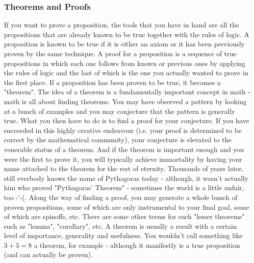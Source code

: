 \subsubsection{Theorems and Proofs}
If you want to prove a proposition, the tools that you have in hand are all the propositions that are already known to be true together with the rules of logic. A proposition is known to be true if it is either an axiom or it has been previously proven by the same technique. A proof for a proposition is a sequence of true propositions in which each one follows from known or previous ones by applying the rules of logic and the last of which is the one you actually wanted to prove in the first place. If a proposition has been proven to be true, it becomes a "theorem". The idea of a theorem is a fundamentally important concept in math - math is all about finding theorems. You may have observed a pattern by looking at a bunch of examples and you may conjecture that the pattern is generally true. What you then have to do is to find a proof for your conjecture. If you have succeeded in this highly creative endeavour (i.e. your proof is determined to be correct by the mathematical community), your conjecture is elevated to the venerable status of a theorem. And if the theorem is important enough and you were the first to prove it, you will typically achieve immortality by having your name attached to the theorem for the rest of eternity. Thousands of years later, still everbody knows the name of Pythagoras today - although, it wasn't actually him who proved "Pythagoras' Theorem" - sometimes the world is a little unfair, too :'-(. Along the way of finding a proof, you may generate a whole bunch of proven propositions, some of which are only instrumental to your final goal, some of which are spinoffs, etc. There are some other terms for such "lesser theorems" such as "lemma", "corollary", etc. A theorem is usually a result with a certain level of importance, generality and usefulness. You wouldn't call something like $3+5=8$ a theorem, for example - although it manifestly is a true proposition (and can actually be proven).

